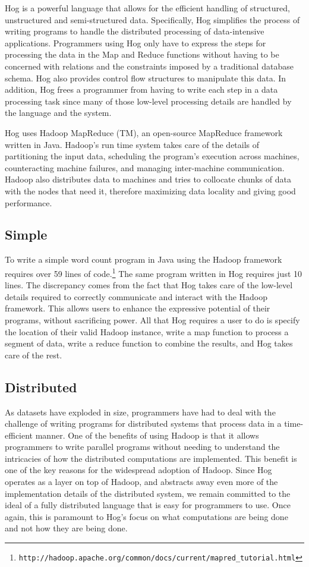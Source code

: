 \documentclass{book}
\begin{document}
Hog is a powerful language that allows for the efficient handling of
structured, unstructured and semi-structured data. Specifically, Hog simplifies
the process of writing programs to handle the distributed processing of
data-intensive applications. Programmers using Hog only have to express the
steps for processing the data in the Map and Reduce functions without having to
be concerned with relations and the constraints imposed by a traditional
database schema. Hog also provides control flow structures to manipulate this
data. In addition, Hog frees a programmer from having to write each step in a
data processing task since many of those low-level processing details are
handled by the language and the system.

Hog uses Hadoop MapReduce (TM), an open-source MapReduce framework written in
Java. Hadoop’s run time system takes care of the details of partitioning the
input data, scheduling the program’s execution across machines, counteracting
machine failures, and managing inter-machine communication. Hadoop also
distributes data to machines and tries to collocate chunks of data with the
nodes that need it, therefore maximizing data locality and giving good
performance.


\subsection{Simple}
\label{sub:simple}

To write a simple word count program in Java using the Hadoop framework
requires over 59 lines of
code.\footnote{\texttt{http://hadoop.apache.org/common/docs/current/mapred\_tutorial.html}}
The same program written in Hog requires just 10 lines. The discrepancy comes
from the fact that Hog takes care of the low-level details required to
correctly communicate and interact with the Hadoop framework. This allows users
to enhance the expressive potential of their programs, without sacrificing
power. All that Hog requires a user to do is specify the location of their
valid Hadoop instance, write a map function to process a segment of data, write
a reduce function to combine the results, and Hog takes care of the rest.


\subsection{Distributed}
\label{sub:distributed}

As datasets have exploded in size, programmers have had to deal with the
challenge of writing programs for distributed systems that process data in a
time-efficient manner. One of the benefits of using Hadoop is that it allows
programmers to write parallel programs without needing to understand the
intricacies of how the distributed computations are implemented. This benefit
is one of the key reasons for the widespread adoption of Hadoop. Since Hog
operates as a layer on top of Hadoop, and abstracts away even more of the
implementation details of the distributed system, we remain committed to the
ideal of a fully distributed language that is easy for programmers to use. Once
again, this is paramount to Hog’s focus on what computations are being done and
not how they are being done.
\end{document}
